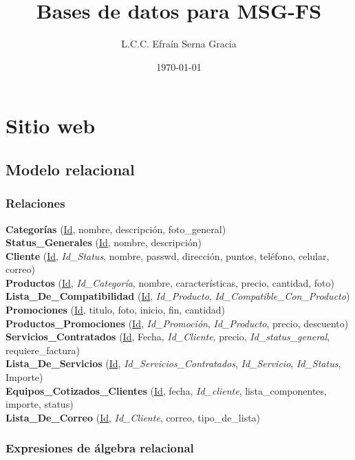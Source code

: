 \documentclass[12pt,spanish,lettersize]{article}
\title{Bases de datos para MSG-FS}
\author{L.C.C. Efra\'in Serna Gracia}
\date{\today}
\begin{document}
\maketitle

\section{Sitio web}

\subsection{Modelo relacional}

\subsubsection{Relaciones}
\textbf{Categor\'ias} (\underline{Id}, nombre, descripci\'on, foto\_general)\\
\textbf{Status\_Generales} (\underline{Id}, nombre, descripci\'on)\\
\textbf{Cliente} (\underline{Id}, \textit{Id\_Status}, nombre, passwd, direcci\'on, puntos, tel\'efono, celular, correo)\\
\textbf{Productos} (\underline{Id}, \textit{Id\_Categor\'ia}, nombre, caracter\'isticas, precio, cantidad, foto)\\
\textbf{Lista\_De\_Compatibilidad} (\underline{Id}, \textit{Id\_Producto}, \textit{Id\_Compatible\_Con\_Producto})\\
\textbf{Promociones} (\underline{Id}, titulo, foto, inicio, fin, cantidad)\\
\textbf{Productos\_Promociones} (\underline{Id}, \textit{Id\_Promoci\'on}, \textit{Id\_Producto}, precio, descuento)\\
\textbf{Servicios\_Contratados} (\underline{Id}, Fecha, \textit{Id\_Cliente}, precio, \textit{Id\_status\_general}, requiere\_factura)\\
\textbf{Lista\_De\_Servicios} (\underline{Id}, \textit{Id\_Servicios\_Contratados}, \textit{Id\_Servicio}, \textit{Id\_Status}, Importe)\\
\textbf{Equipos\_Cotizados\_Clientes} (\underline{Id}, fecha, \textit{Id\_cliente}, lista\_componentes, importe, status)\\
\textbf{Lista\_De\_Correo} (\underline{Id}, \textit{Id\_Cliente}, correo, tipo\_de\_lista)\\

\subsubsection{Expresiones de \'algebra relacional}
\end{document}
